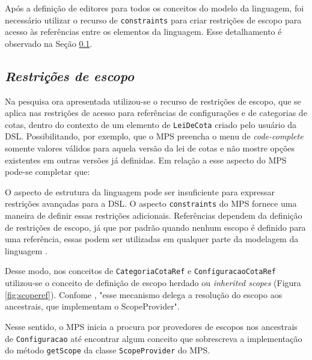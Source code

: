 



\newpage
Após a definição de editores para todos os conceitos do modelo da linguagem, foi necessário utilizar o recurso de \texttt{constraints} para criar restrições de escopo para acesso às referências entre os elementos da linguagem. Esse detalhamento é observado na Seção \ref{sub:sec:constraints}.

\newpage
\subsection{\textit{Restrições de escopo}}
\label{sub:sec:constraints}

Na pesquisa ora apresentada utilizou-se o recurso de restrições de escopo, que se aplica nas restrições de acesso para referências de configurações e de categorias de cotas, dentro do contexto de um elemento de \texttt{LeiDeCota} criado pelo usuário da DSL. Possibilitando, por exemplo, que o \gls{MPS} preencha o menu de \textit{code-complete} somente valores válidos para aquela versão da lei de cotas e não mostre opções existentes em  outras versões já definidas. Em relação a esse aspecto do MPS pode-se completar que:
 
\begin{citacao}
O aspecto de estrutura da linguagem pode ser insuficiente para expressar restrições avançadas para a DSL. O aspecto \texttt{constraints} do MPS fornece uma maneira de definir essas restrições adicionais. Referências dependem da definição de restrições de escopo, já que por padrão quando nenhum escopo é definido para uma referência, essas podem ser utilizadas em qualquer parte da modelagem da linguagem \cite[s/p, tradução nossa]{jetbrains}.
\end{citacao}

Desse modo, nos conceitos de \texttt{CategoriaCotaRef} e \texttt{ConfiguracaoCotaRef} utilizou-se o conceito de definição de escopo herdado ou \textit{inherited scopes} (Figura \ref{fig:scoperef}). Confome , "esse mecanismo delega a resolução do escopo aos ancestrais, que implementam o ScopeProvider".



\newpage

Nesse sentido, o \gls{MPS} inicia a procura por provedores de escopos nos ancestrais de \texttt{Configuracao} até encontrar algum conceito que sobrescreva a implementação do método \texttt{getScope} da classe \texttt{ScopeProvider} do \gls{MPS}. 

